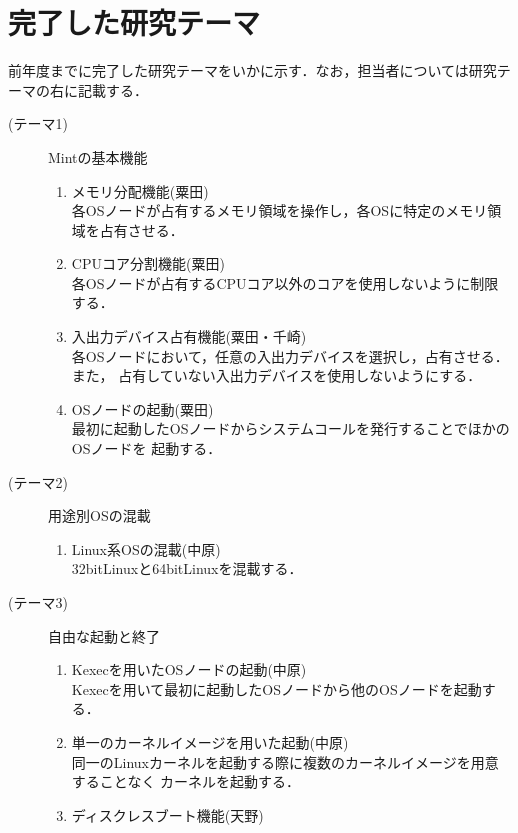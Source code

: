 \documentclass[12pt]{jsarticle}
\begin{document}
\section{完了した研究テーマ}
前年度までに完了した研究テーマをいかに示す．なお，担当者については研究テーマの右に記載する．
\begin{description}
    \item[(テーマ1)]Mintの基本機能
        \begin{enumerate}
            \item メモリ分配機能(粟田)\\
                各OSノードが占有するメモリ領域を操作し，各OSに特定のメモリ領域を占有させる．
            \item CPUコア分割機能(粟田)\\
                各OSノードが占有するCPUコア以外のコアを使用しないように制限する．
            \item 入出力デバイス占有機能(粟田・千崎)\\
                各OSノードにおいて，任意の入出力デバイスを選択し，占有させる．また，
                占有していない入出力デバイスを使用しないようにする．
            \item OSノードの起動(粟田)\\
                最初に起動したOSノードからシステムコールを発行することでほかのOSノードを
                起動する．
        \end{enumerate}
    \item[(テーマ2)]用途別OSの混載
        \begin{enumerate}
            \item Linux系OSの混載(中原)\\
                32bitLinuxと64bitLinuxを混載する．
        \end{enumerate}
    \item[(テーマ3)]自由な起動と終了
        \begin{enumerate}
            \item Kexecを用いたOSノードの起動(中原)\\
                Kexecを用いて最初に起動したOSノードから他のOSノードを起動する．
            \item 単一のカーネルイメージを用いた起動(中原)\\
                同一のLinuxカーネルを起動する際に複数のカーネルイメージを用意することなく
                カーネルを起動する．
            \item ディスクレスブート機能(天野)\\

\end{enumerate}
\end{description}
\end{document}
